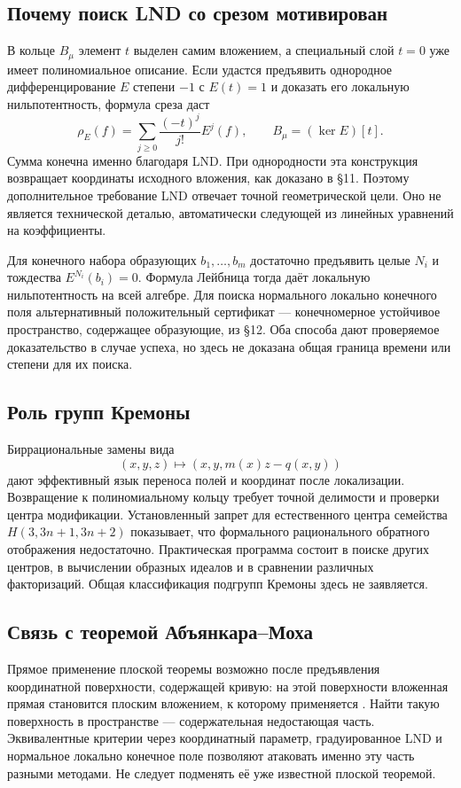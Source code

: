\subsection*{Почему поиск LND со срезом мотивирован}
В кольце $B_\mu$ элемент $t$ выделен самим вложением, а специальный слой
$t=0$ уже имеет полиномиальное описание. Если удастся предъявить
однородное дифференцирование $E$ степени $-1$ с $E(t)=1$ и доказать его
локальную нильпотентность, формула среза даст
\[
 \rho_E(f)=\sum_{j\ge0}\frac{(-t)^j}{j!}E^j(f),\qquad
 B_\mu=(\ker E)[t].
\]
Сумма конечна именно благодаря LND. При однородности эта конструкция
возвращает координаты исходного вложения, как доказано в \S11.
Поэтому дополнительное требование LND отвечает точной геометрической
цели. Оно не является технической деталью, автоматически следующей
из линейных уравнений на коэффициенты.

Для конечного набора образующих $b_1,\ldots,b_m$ достаточно предъявить
целые $N_i$ и тождества $E^{N_i}(b_i)=0$. Формула Лейбница тогда даёт
локальную нильпотентность на всей алгебре. Для поиска нормального
локально конечного поля альтернативный положительный сертификат ---
конечномерное устойчивое пространство, содержащее образующие, из \S12.
Оба способа дают проверяемое доказательство в случае успеха,
но здесь не доказана общая граница времени или степени для их поиска.

\subsection*{Роль групп Кремоны}
Биррациональные замены вида
\[
 (x,y,z)\longmapsto (x,y,m(x)z-q(x,y))
\]
дают эффективный язык переноса полей и координат после локализации.
Возвращение к полиномиальному кольцу требует точной делимости и проверки
центра модификации. Установленный запрет для естественного центра
семейства $H(3,3n+1,3n+2)$ показывает, что формального рационального
обратного отображения недостаточно. Практическая программа состоит
в поиске других центров, в вычислении образных идеалов и в сравнении
различных факторизаций. Общая классификация подгрупп Кремоны здесь
не заявляется.

\subsection*{Связь с теоремой Абъянкара--Моха}
Прямое применение плоской теоремы возможно после предъявления
координатной поверхности, содержащей кривую: на этой поверхности
вложенная прямая становится плоским вложением, к которому применяется
\cite{AM,Suzuki}. Найти такую поверхность в пространстве ---
содержательная недостающая часть. Эквивалентные критерии через
координатный параметр, градуированное LND и нормальное локально конечное
поле позволяют атаковать именно эту часть разными методами.
Не следует подменять её уже известной плоской теоремой.

